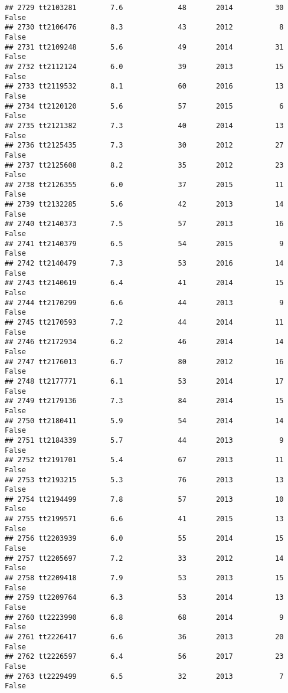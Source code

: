 \documentclass[
]{article}
\begin{document}
\begin{verbatim}
## 2729 tt2103281        7.6             48       2014          30   False
## 2730 tt2106476        8.3             43       2012           8   False
## 2731 tt2109248        5.6             49       2014          31   False
## 2732 tt2112124        6.0             39       2013          15   False
## 2733 tt2119532        8.1             60       2016          13   False
## 2734 tt2120120        5.6             57       2015           6   False
## 2735 tt2121382        7.3             40       2014          13   False
## 2736 tt2125435        7.3             30       2012          27   False
## 2737 tt2125608        8.2             35       2012          23   False
## 2738 tt2126355        6.0             37       2015          11   False
## 2739 tt2132285        5.6             42       2013          14   False
## 2740 tt2140373        7.5             57       2013          16   False
## 2741 tt2140379        6.5             54       2015           9   False
## 2742 tt2140479        7.3             53       2016          14   False
## 2743 tt2140619        6.4             41       2014          15   False
## 2744 tt2170299        6.6             44       2013           9   False
## 2745 tt2170593        7.2             44       2014          11   False
## 2746 tt2172934        6.2             46       2014          14   False
## 2747 tt2176013        6.7             80       2012          16   False
## 2748 tt2177771        6.1             53       2014          17   False
## 2749 tt2179136        7.3             84       2014          15   False
## 2750 tt2180411        5.9             54       2014          14   False
## 2751 tt2184339        5.7             44       2013           9   False
## 2752 tt2191701        5.4             67       2013          11   False
## 2753 tt2193215        5.3             76       2013          13   False
## 2754 tt2194499        7.8             57       2013          10   False
## 2755 tt2199571        6.6             41       2015          13   False
## 2756 tt2203939        6.0             55       2014          15   False
## 2757 tt2205697        7.2             33       2012          14   False
## 2758 tt2209418        7.9             53       2013          15   False
## 2759 tt2209764        6.3             53       2014          13   False
## 2760 tt2223990        6.8             68       2014           9   False
## 2761 tt2226417        6.6             36       2013          20   False
## 2762 tt2226597        6.4             56       2017          23   False
## 2763 tt2229499        6.5             32       2013           7   False

\end{verbatim}
\end{document}
